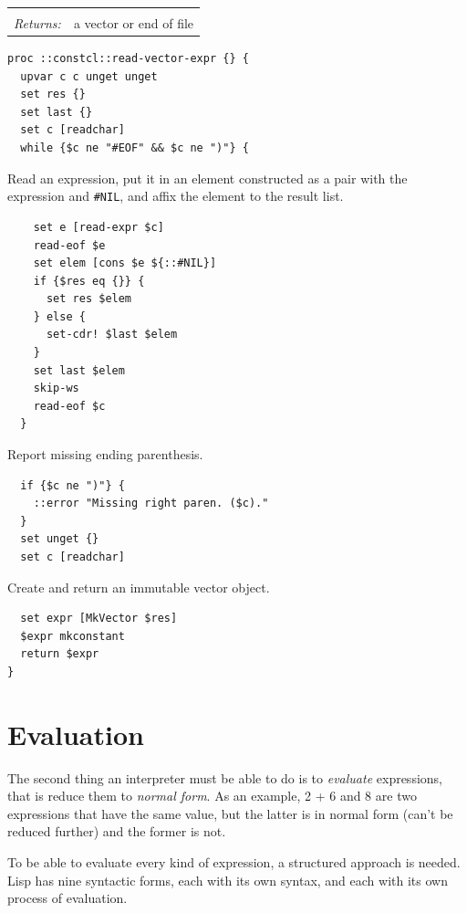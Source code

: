 \documentclass[twoside]{report}
\begin{document}
\noindent\begin{tabular}{ |p{1.9cm} p{8cm}| }
\hline
\rowcolor[HTML]{CCCCCC} \multicolumn{2}{|l|}{\bf read-vector-expr (internal)} \\
\textit{Returns:} & a vector or end of file \\
\hline
\end{tabular}

\begin{lstlisting}
proc ::constcl::read-vector-expr {} {
  upvar c c unget unget
  set res {}
  set last {}
  set c [readchar]
  while {$c ne "#EOF" && $c ne ")"} {
\end{lstlisting}

Read an expression, put it in an element constructed as a pair with the expression and \texttt{\#NIL}, and affix the element to the result list.

\begin{lstlisting}
    set e [read-expr $c]
    read-eof $e
    set elem [cons $e ${::#NIL}]
    if {$res eq {}} {
      set res $elem
    } else {
      set-cdr! $last $elem
    }
    set last $elem
    skip-ws
    read-eof $c
  }
\end{lstlisting}

Report missing ending parenthesis.

\begin{lstlisting}
  if {$c ne ")"} {
    ::error "Missing right paren. ($c)."
  }
  set unget {}
  set c [readchar]
\end{lstlisting}

Create and return an immutable vector object.

\begin{lstlisting}
  set expr [MkVector $res]
  $expr mkconstant
  return $expr
}
\end{lstlisting}

\chapter{Evaluation}
\label{evaluation}

The second thing an interpreter must be able to do is to \emph{evaluate} expressions, that is reduce them to \emph{normal form}. As an example, 2 + 6 and 8 are two expressions that have the same value, but the latter is in normal form (can't be reduced further) and the former is not.

To be able to evaluate every kind of expression, a structured approach is needed. Lisp has nine syntactic forms, each with its own syntax, and each with its own process of evaluation.
\end{document}
